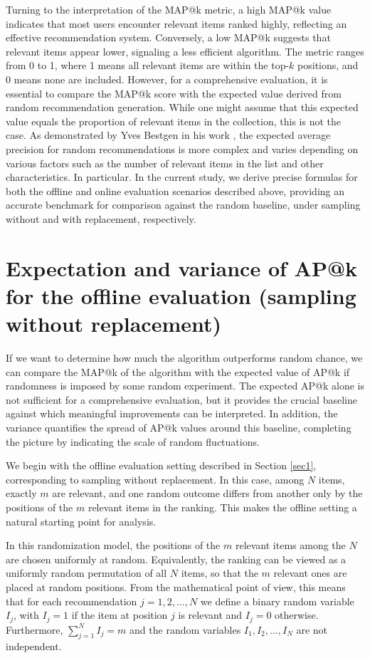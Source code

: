 \documentclass{tpms-l}
\theoremstyle{definition}
\theoremstyle{remark}
\numberwithin{equation}{section}
\begin{document}
Turning to the interpretation of the MAP@k metric, a high MAP@k value indicates that most users encounter relevant items ranked highly, reflecting an effective recommendation system. Conversely, a low MAP@k suggests that relevant items appear lower, signaling a less efficient algorithm. The metric ranges from 0 to 1, where 1 means all relevant items are within the top-$k$ positions, and 0 means none are included.
However, for a comprehensive evaluation, it is essential to compare the MAP@k score with the expected value derived from random recommendation generation. While one might assume that this expected value equals the proportion of relevant items in the collection, this is not the case. As demonstrated by Yves Bestgen in his work \cite{article_Bestgen}, the expected average precision for random recommendations is more complex and varies depending on various factors such as the number of relevant items in the list and other characteristics. In particular.   In the current study, we derive precise formulas for both the offline and online evaluation scenarios described above, providing an accurate benchmark for comparison against the random baseline, under sampling without and with replacement, respectively.



\section{Expectation and variance of AP@k for the offline evaluation (sampling without replacement)}\label{sec3}

If we want to determine how much the algorithm outperforms random chance, we can compare the MAP@k of the algorithm with the expected value of AP@k if randomness is imposed by some random experiment. The expected AP@k alone is not sufficient for a comprehensive evaluation, but it provides the crucial baseline against which meaningful improvements can be interpreted. In addition, the variance quantifies the spread of AP@k values around this baseline, completing the picture by indicating the scale of random fluctuations. 

We begin with the offline evaluation setting described in Section \ref{sec1}, corresponding to sampling without replacement. In this case, among $N$ items, exactly $m$ are relevant, and one random outcome differs from another only by the positions of the $m$ relevant items in the ranking. This makes the offline setting a natural starting point for analysis. 

In this randomization model, the positions of the $m$ relevant items among the $N$ are chosen uniformly at random. 
Equivalently, the ranking can be viewed as a uniformly random permutation of all $N$ items, so that the $m$ relevant ones are placed at random positions. 
From the mathematical point of view, this means that for each recommendation $j = 1, 2, \ldots, N$ we define a binary random variable $I_j$, with $I_j = 1$ if the item at position $j$ is relevant and $I_j = 0$ otherwise. Furthermore,  $\sum_{j=1}^NI_j=m$ and the random variables $I_1, I_2, ..., I_N$ are not independent.
\end{document}
